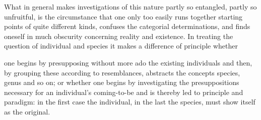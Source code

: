 \documentclass[12pt,a4paper]{book}
\begin{document}
What in general makes investigations of this nature partly so entangled, partly
so unfruitful, is the circumstance that one only too easily runs together
starting points of quite different kinds, confuses the categorial
determinations, and finds oneself in much obscurity concerning reality and
existence. In treating the question of individual and species it makes a
difference of principle whether

\setcounter{footnote}{0}
one begins by presupposing without more ado the existing individuals and then,
by grouping these according to resemblances, abstracts the concepts species,
genus and so on; or whether one begins by investigating the presuppositions
necessary for an individual's coming-to-be and is thereby led to principle and
paradigm: in the first case the individual, in the last the species, must show
itself as the original.
\end{document}
